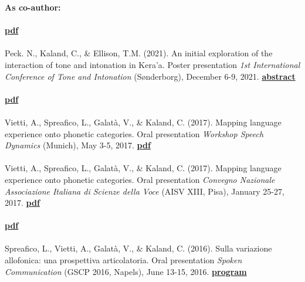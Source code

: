 \documentclass[a4paper,11pt]{article}
\begin{document}
\noindent\textbf{As co-author:}\\\\
 \textcolor{red}{\textbf{\lbrack\href{https://www.isca-speech.org/archive/pdfs/speechprosody_2022/seeliger22_speechprosody.pdf}{pdf}\rbrack}}\\\\
Peck. N., Kaland, C., \& Ellison, T.M. (2021). An initial exploration of the interaction of tone and intonation in Kera'a. Poster presentation \textit{1st International Conference of Tone and Intonation} (Sønderborg), December 6-9, 2021. \textcolor{red}{\textbf{\lbrack\href{https://syddanskuni-my.sharepoint.com/:b:/g/personal/olni_sdu_dk/EXijmpDKp8tBtJmt0LGZRloBie8n0j2b1RUF_UekVoHXZg?e=ijD3c6}{abstract}\rbrack}}\\\\
 \textcolor{red}{\textbf{\lbrack\href{http://intro2psycholing.net/ICPhS/papers/ICPhS_2543.pdf}{pdf}\rbrack}}\\\\
Vietti, A., Spreafico, L., Galat\`a, V., \& Kaland, C. (2017). Mapping language experience onto phonetic categories. Oral presentation \textit{Workshop Speech Dynamics} (Munich), May 3-5, 2017. \textcolor{red}{\textbf{\lbrack\href{http://www.phonetik.uni-muenchen.de/institut/veranstaltungen/abstraction-diversity-dynamics/bilder/DYNAMICS_2017_paper_34.pdf}{pdf}\rbrack}}\\\\
Vietti, A., Spreafico, L., Galat\`a, V., \& Kaland, C. (2017). Mapping language experience onto phonetic categories. Oral presentation \textit{Convegno Nazionale Associazione Italiana di Scienze della Voce} (AISV XIII, Pisa), January 25-27, 2017. \textcolor{red}{\textbf{\lbrack\href{http://linguistica.sns.it/AISV/abstract/Vietti\%20et\%20al..pdf}{pdf}\rbrack}}\\\\
 \textcolor{red}{\textbf{\lbrack\href{http://www.isca-speech.org/archive/Interspeech_2016/pdfs/0434.PDF}{pdf}\rbrack}}\\\\
Spreafico, L., Vietti, A., Galat\`a, V., \& Kaland, C. (2016). Sulla variazione allofonica: una prospettiva articolatoria. Oral presentation \textit{Spoken Communication} (GSCP 2016, Napels), June 13-15, 2016. \textcolor{red}{\textbf{\lbrack\href{http://www.sli-gscp.it/index.php/programme}{program}\rbrack}}\\\\
\end{document}
